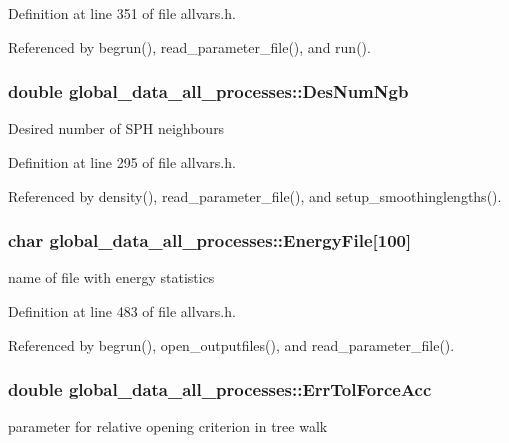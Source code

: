 Definition at line 351 of file allvars.h.



Referenced by begrun(), read\_\-parameter\_\-file(), and run().

\hypertarget{structglobal__data__all__processes_accb74aa1ccf3fb13e31f5704bb692313}{
\subsubsection[{DesNumNgb}]{\setlength{\rightskip}{0pt plus 5cm}double {\bf global\_\-data\_\-all\_\-processes::DesNumNgb}}}
\label{structglobal__data__all__processes_accb74aa1ccf3fb13e31f5704bb692313}
Desired number of SPH neighbours 

Definition at line 295 of file allvars.h.



Referenced by density(), read\_\-parameter\_\-file(), and setup\_\-smoothinglengths().

\hypertarget{structglobal__data__all__processes_aa97394ab3a522c46b75f8b57a59ca0b5}{
\subsubsection[{EnergyFile}]{\setlength{\rightskip}{0pt plus 5cm}char {\bf global\_\-data\_\-all\_\-processes::EnergyFile}\mbox{[}100\mbox{]}}}
\label{structglobal__data__all__processes_aa97394ab3a522c46b75f8b57a59ca0b5}
name of file with energy statistics 

Definition at line 483 of file allvars.h.



Referenced by begrun(), open\_\-outputfiles(), and read\_\-parameter\_\-file().

\hypertarget{structglobal__data__all__processes_a5a8eb914026679a7c816a09c20d25de0}{
\subsubsection[{ErrTolForceAcc}]{\setlength{\rightskip}{0pt plus 5cm}double {\bf global\_\-data\_\-all\_\-processes::ErrTolForceAcc}}}
\label{structglobal__data__all__processes_a5a8eb914026679a7c816a09c20d25de0}
parameter for relative opening criterion in tree walk 

